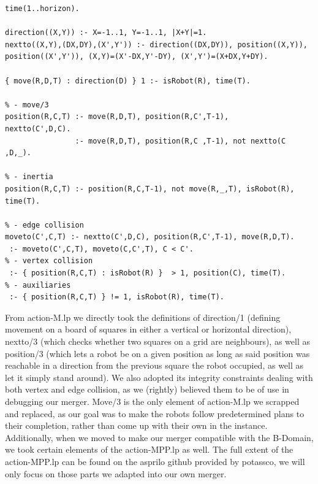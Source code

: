 \documentclass{llncs}
\begin{document}
\begin{lstlisting}[basicstyle=\fontsize{9}{11}\selectfont\ttfamily,frame=single,breaklines=true]
time(1..horizon).

direction((X,Y)) :- X=-1..1, Y=-1..1, |X+Y|=1.
nextto((X,Y),(DX,DY),(X',Y')) :- direction((DX,DY)), position((X,Y)), position((X',Y')), (X,Y)=(X'-DX,Y'-DY), (X',Y')=(X+DX,Y+DY).

{ move(R,D,T) : direction(D) } 1 :- isRobot(R), time(T).

% - move/3
position(R,C,T) :- move(R,D,T), position(R,C',T-1),     nextto(C',D,C).
                :- move(R,D,T), position(R,C ,T-1), not nextto(C ,D,_).

% - inertia 
position(R,C,T) :- position(R,C,T-1), not move(R,_,T), isRobot(R), time(T).

% - edge collision
moveto(C',C,T) :- nextto(C',D,C), position(R,C',T-1), move(R,D,T).
 :- moveto(C',C,T), moveto(C,C',T), C < C'.
% - vertex collision
 :- { position(R,C,T) : isRobot(R) }  > 1, position(C), time(T).
% - auxiliaries 
 :- { position(R,C,T) } != 1, isRobot(R), time(T).
\end{lstlisting}
From action-M.lp we directly took the definitions of direction/1 (defining movement on a board of squares in either a vertical or horizontal direction), nextto/3 (which checks whether two squares on a grid are neighbours), as well as position/3 (which lets a robot be on a given position as long as said position was reachable in a direction from the previous square the robot occupied, as well as let it simply stand around). \newline
We also adopted its integrity constraints dealing with both vertex and edge collision, as we (rightly) believed them to be of use in debugging our merger. Move/3 is the only element of action-M.lp we scrapped and replaced, as our goal was to make the robots follow predetermined plans to their completion, rather than come up with their own in the instance.\newline\newline
Additionally, when we moved to make our merger compatible with the B-Domain, we took certain elements of the action-MPP.lp as well. The full extent of the action-MPP.lp can be found on the asprilo github provided by potassco, we will only focus on those parts we adapted into our own merger.
\end{document}
